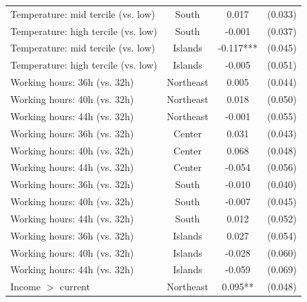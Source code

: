 \begin{table}[H]
\begin{tabular}{ l c c c }
\hspace{0.05cm} Temperature: mid tercile (vs. low) & South & 0.017 & (0.033) \\
\hspace{0.05cm} Temperature: high tercile (vs. low) & South & -0.001 & (0.037) \\
\hspace{0.05cm} Temperature: mid tercile (vs. low) & Islands & -0.117*** & (0.045) \\
\hspace{0.05cm} Temperature: high tercile (vs. low) & Islands & -0.005 & (0.051) \\
\hspace{0.05cm} Working hours: 36h (vs. 32h) & Northeast & 0.005 & (0.044) \\
\hspace{0.05cm} Working hours: 40h (vs. 32h) & Northeast & 0.018 & (0.050) \\
\hspace{0.05cm} Working hours: 44h (vs. 32h) & Northeast & -0.001 & (0.055) \\
\hspace{0.05cm} Working hours: 36h (vs. 32h) & Center & 0.031 & (0.043) \\
\hspace{0.05cm} Working hours: 40h (vs. 32h) & Center & 0.068 & (0.048) \\
\hspace{0.05cm} Working hours: 44h (vs. 32h) & Center & -0.054 & (0.056) \\
\hspace{0.05cm} Working hours: 36h (vs. 32h) & South & -0.010 & (0.040) \\
\hspace{0.05cm} Working hours: 40h (vs. 32h) & South & -0.007 & (0.045) \\
\hspace{0.05cm} Working hours: 44h (vs. 32h) & South & 0.012 & (0.052) \\
\hspace{0.05cm} Working hours: 36h (vs. 32h) & Islands & 0.027 & (0.054) \\
\hspace{0.05cm} Working hours: 40h (vs. 32h) & Islands & -0.028 & (0.060) \\
\hspace{0.05cm} Working hours: 44h (vs. 32h) & Islands & -0.059 & (0.069) \\
\hspace{0.05cm} Income $>$ current & Northeast & 0.095** & (0.048) \\

\end{tabular}
\end{table}
